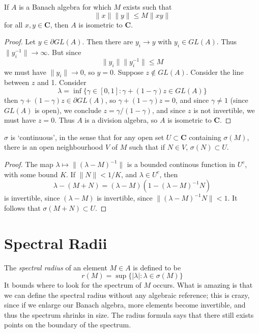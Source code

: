 \begin{theorem}
    If $A$ is a Banach algebra for which $M$ exists such that
    \[ \| x \| \| y \| \leq M \| x y \| \]
    for all $x,y \in \mathbf{C}$, then $A$ is isometric to $\mathbf{C}$.
\end{theorem}
\begin{proof}
    Let $y \in \partial GL(A)$. Then there are $y_i \to y$ with $y_i \in GL(A)$. Thus $\| y_i^{-1} \| \to \infty$. But since
    \[ \| y_i \| \| y_i^{-1} \| \leq M \]
    we must have $\| y_i \| \to 0$, so $y = 0$. Suppose $z \not \in GL(A)$. Consider the line between $z$ and 1. Consider
    \[ \lambda = \inf \{ \gamma \in [0,1] : \gamma + (1 - \gamma) z \in GL(A) \} \]
    then $\gamma + (1 - \gamma) z \in \partial GL(A)$, so $\gamma + (1 - \gamma) z = 0$, and since $\gamma \neq 1$ (since $GL(A)$ is open), we conclude $z = \gamma/(1-\gamma)$, and since $z$ is not invertible, we must have $z = 0$. Thus $A$ is a division algebra, so $A$ is isometric to $\mathbf{C}$.
\end{proof}

\begin{theorem}
    $\sigma$ is `continuous', in the sense that for any open set $U \subset \mathbf{C}$ containing $\sigma(M)$, there is an open neighbourhood $V$ of $M$ such that if $N \in V$, $\sigma(N) \subset U$.
\end{theorem}
\begin{proof}
    The map $\lambda \mapsto \| (\lambda - M)^{-1} \|$ is a bounded continous function in $U^c$, with some bound $K$. If $\| N \| < 1/K$, and $\lambda \in U^c$, then
    \[ \lambda - (M + N) = (\lambda - M)(1 - (\lambda - M)^{-1}N) \]
    is invertible, since $(\lambda - M)$ is invertible, since $\| (\lambda - M)^{-1} N \| < 1$. It follows that $\sigma(M + N) \subset U$.
\end{proof}

\section{Spectral Radii}

The \emph{spectral radius} of an element $M \in A$ is defined to be
%
\[ r(M) = \sup \{ |\lambda| : \lambda \in \sigma(M) \} \]
%
It bounds where to look for the spectrum of $M$ occurs. What is amazing is that we can define the spectral radius without any algebraic reference; this is crazy, since if we enlarge our Banach algebra, more elements become invertible, and thus the spectrum shrinks in size. The radius formula says that there still exists points on the boundary of the spectrum.

